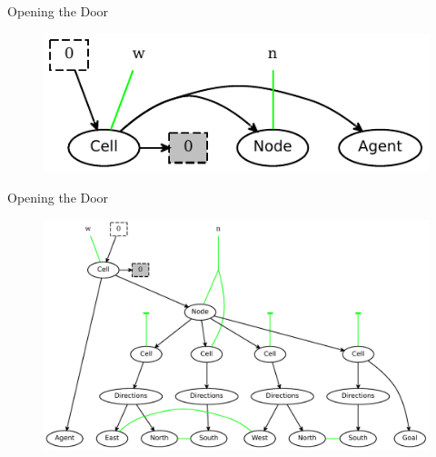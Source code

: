 \documentclass{beamer}
\begin{document}
\begin{frame}{Opening the Door}
  \begin{figure}
    \centering
    \includegraphics{../models/agent2/closedDoor_lhs.pdf}
  \end{figure}
\end{frame}

\begin{frame}{Opening the Door}
  \begin{figure}
    \centering
    \includegraphics[width=\textwidth]{../models/agent2/closedDoor_rhs.pdf}
  \end{figure}
\end{frame}
\end{document}
